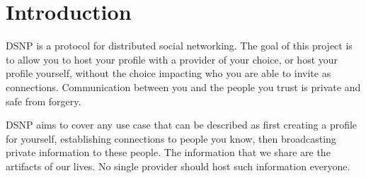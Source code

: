 \documentclass[letterpaper,11pt,oneside]{article}
\begin{document}
\newpage

\tableofcontents

%
%


%
%
%


\section{Introduction}

%
%
% 

DSNP is a protocol for distributed social networking. The goal of this project
is to allow you to host your profile with a provider of your choice, or host
your profile yourself, without the choice impacting who you are able to invite
as connections. Communication between you and the people you trust is private
and safe from forgery.

DSNP aims to cover any use case that can be described as first creating a
profile for yourself, establishing connections to people you know, then
broadcasting private information to these people. The information that we share
are the artifacts of our lives. No single provider should host such information
everyone.
\end{document}
